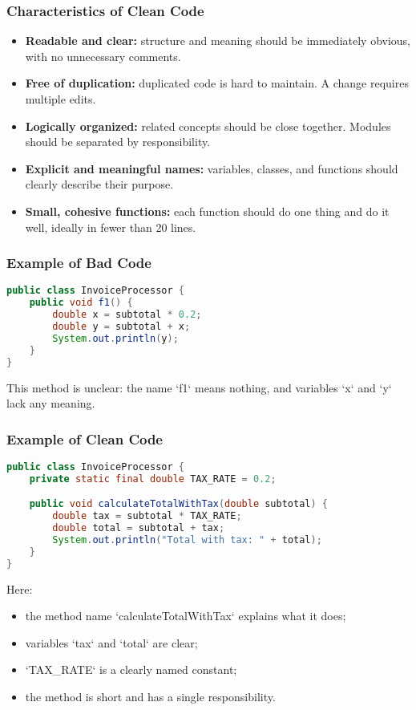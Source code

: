 \documentclass[a4paper,12pt]{article}
\begin{document}
\subsubsection{Characteristics of Clean Code}
\begin{itemize}
  \item \textbf{Readable and clear:} structure and meaning should be immediately obvious, with no unnecessary comments.
  \item \textbf{Free of duplication:} duplicated code is hard to maintain. A change requires multiple edits.
  \item \textbf{Logically organized:} related concepts should be close together. Modules should be separated by responsibility.
  \item \textbf{Explicit and meaningful names:} variables, classes, and functions should clearly describe their purpose.
  \item \textbf{Small, cohesive functions:} each function should do one thing and do it well, ideally in fewer than 20 lines.
\end{itemize}

\subsubsection{Example of Bad Code}
\begin{lstlisting}[language=Java]
public class InvoiceProcessor {
    public void f1() {
        double x = subtotal * 0.2;
        double y = subtotal + x;
        System.out.println(y);
    }
}
\end{lstlisting}
This method is unclear: the name `f1` means nothing, and variables `x` and `y` lack any meaning.

\subsubsection{Example of Clean Code}
\begin{lstlisting}[language=Java]
public class InvoiceProcessor {
    private static final double TAX_RATE = 0.2;

    public void calculateTotalWithTax(double subtotal) {
        double tax = subtotal * TAX_RATE;
        double total = subtotal + tax;
        System.out.println("Total with tax: " + total);
    }
}
\end{lstlisting}

Here:
\begin{itemize}
  \item the method name `calculateTotalWithTax` explains what it does;
  \item variables `tax` and `total` are clear;
  \item `TAX\_RATE` is a clearly named constant;
  \item the method is short and has a single responsibility.
\end{itemize}
\end{document}
